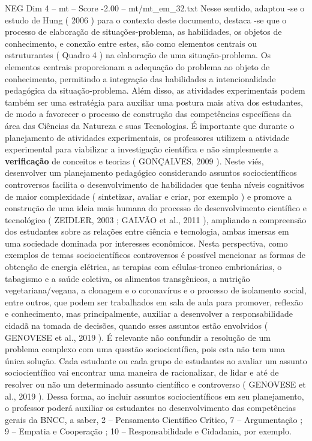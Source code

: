 \begin{textsample}{NEG Dim 4 – mt – Score -2.00 – mt/mt\_em\_32.txt}
Nesse sentido, adaptou -se o estudo de Hung ( 2006 ) para o contexto deste documento, destaca -se que o processo de elaboração de situações-problema, as habilidades, os objetos de conhecimento, e conexão entre estes, são como elementos centrais ou estruturantes ( Quadro 4 ) na elaboração de uma situação-problema.
Os elementos centrais proporcionam a adequação do problema ao objeto de conhecimento, permitindo a integração das habilidades a intencionalidade pedagógica da situação-problema.
Além disso, as atividades experimentais podem também ser uma estratégia para auxiliar uma postura mais ativa dos estudantes, de modo a favorecer o processo de construção das competências específicas da área das Ciências da Natureza e suas Tecnologias.
É importante que durante o planejamento de atividades experimentais, os professores utilizem a atividade experimental para viabilizar a investigação científica e não simplesmente a \textbf{verificação} de conceitos e teorias ( GONÇALVES, 2009 ).
Neste viés, desenvolver um planejamento pedagógico considerando assuntos sociocientíficos controversos facilita o desenvolvimento de habilidades que tenha níveis cognitivos de maior complexidade ( sintetizar, avaliar e criar, por exemplo ) e promove a construção de uma ideia mais humana do processo de desenvolvimento científico e tecnológico ( ZEIDLER, 2003 ; GALVÃO et al., 2011 ), ampliando a compreensão dos estudantes sobre as relações entre ciência e tecnologia, ambas imersas em uma sociedade dominada por interesses econômicos.
Nesta perspectiva, como exemplos de temas sociocientíficos controversos é possível mencionar as formas de obtenção de energia elétrica, as terapias com células-tronco embrionárias, o tabagismo e a saúde coletiva, os alimentos transgênicos, a nutrição vegetariana/vegana, a clonagem e o coronavírus e o processo de isolamento social, entre outros, que podem ser trabalhados em sala de aula para promover, reflexão e conhecimento, mas principalmente, auxiliar a desenvolver a responsabilidade cidadã na tomada de decisões, quando esses assuntos estão envolvidos ( GENOVESE et al., 2019 ).
É relevante não confundir a resolução de um problema complexo com uma questão sociocientífica, pois esta não tem uma única solução.
Cada estudante ou cada grupo de estudantes ao avaliar um assunto sociocientífico vai encontrar uma maneira de racionalizar, de lidar e até de resolver ou não um determinado assunto científico e controverso ( GENOVESE et al., 2019 ).
Dessa forma, ao incluir assuntos sociocientíficos em seu planejamento, o professor poderá auxiliar os estudantes no desenvolvimento das competências gerais da BNCC, a saber, 2 – Pensamento Científico Crítico, 7 – Argumentação ; 9 – Empatia e Cooperação ; 10 – Responsabilidade e Cidadania, por exemplo.

\end{textsample}

